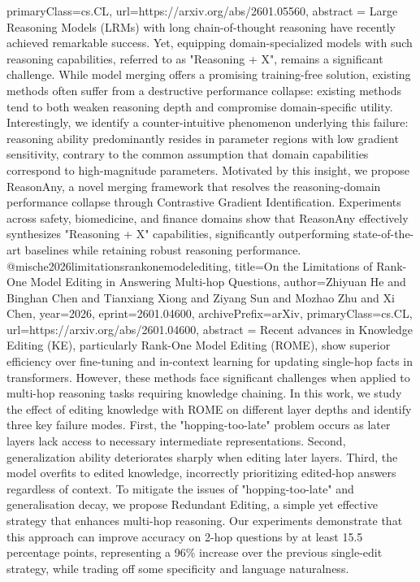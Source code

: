 {      primaryClass={cs.CL},
      url={https://arxiv.org/abs/2601.05560},
      abstract = {Large Reasoning Models (LRMs) with long chain-of-thought reasoning have recently achieved remarkable success. Yet, equipping domain-specialized models with such reasoning capabilities, referred to as "Reasoning + X", remains a significant challenge. While model merging offers a promising training-free solution, existing methods often suffer from a destructive performance collapse: existing methods tend to both weaken reasoning depth and compromise domain-specific utility. Interestingly, we identify a counter-intuitive phenomenon underlying this failure: reasoning ability predominantly resides in parameter regions with low gradient sensitivity, contrary to the common assumption that domain capabilities correspond to high-magnitude parameters. Motivated by this insight, we propose ReasonAny, a novel merging framework that resolves the reasoning-domain performance collapse through Contrastive Gradient Identification. Experiments across safety, biomedicine, and finance domains show that ReasonAny effectively synthesizes "Reasoning + X" capabilities, significantly outperforming state-of-the-art baselines while retaining robust reasoning performance.}
}@misc{he2026limitationsrankonemodelediting,
      title={On the Limitations of Rank-One Model Editing in Answering Multi-hop Questions}, 
      author={Zhiyuan He and Binghan Chen and Tianxiang Xiong and Ziyang Sun and Mozhao Zhu and Xi Chen},
      year={2026},
      eprint={2601.04600},
      archivePrefix={arXiv},
      primaryClass={cs.CL},
      url={https://arxiv.org/abs/2601.04600},
      abstract = {Recent advances in Knowledge Editing (KE), particularly Rank-One Model Editing (ROME), show superior efficiency over fine-tuning and in-context learning for updating single-hop facts in transformers. However, these methods face significant challenges when applied to multi-hop reasoning tasks requiring knowledge chaining. In this work, we study the effect of editing knowledge with ROME on different layer depths and identify three key failure modes. First, the "hopping-too-late" problem occurs as later layers lack access to necessary intermediate representations. Second, generalization ability deteriorates sharply when editing later layers. Third, the model overfits to edited knowledge, incorrectly prioritizing edited-hop answers regardless of context. To mitigate the issues of "hopping-too-late" and generalisation decay, we propose Redundant Editing, a simple yet effective strategy that enhances multi-hop reasoning. Our experiments demonstrate that this approach can improve accuracy on 2-hop questions by at least 15.5 percentage points, representing a 96\% increase over the previous single-edit strategy, while trading off some specificity and language naturalness.}
}
